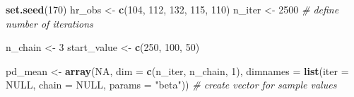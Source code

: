 \documentclass[
  12pt,
]{book}
\newenvironment{Shaded}{\begin{snugshade}}{\end{snugshade}}
\newcommand{\CommentTok}[1]{\textcolor[rgb]{0.56,0.35,0.01}{\textit{#1}}}
\newcommand{\DataTypeTok}[1]{\textcolor[rgb]{0.13,0.29,0.53}{#1}}
\newcommand{\DecValTok}[1]{\textcolor[rgb]{0.00,0.00,0.81}{#1}}
\newcommand{\KeywordTok}[1]{\textcolor[rgb]{0.13,0.29,0.53}{\textbf{#1}}}
\newcommand{\NormalTok}[1]{#1}
\newcommand{\OtherTok}[1]{\textcolor[rgb]{0.56,0.35,0.01}{#1}}
\newcommand{\StringTok}[1]{\textcolor[rgb]{0.31,0.60,0.02}{#1}}
\begin{document}
\begin{Shaded}
\begin{Highlighting}[]
\KeywordTok{set.seed}\NormalTok{(}\DecValTok{170}\NormalTok{)}
\NormalTok{hr\_obs \textless{}{-}}\StringTok{ }\KeywordTok{c}\NormalTok{(}\DecValTok{104}\NormalTok{, }\DecValTok{112}\NormalTok{, }\DecValTok{132}\NormalTok{, }\DecValTok{115}\NormalTok{, }\DecValTok{110}\NormalTok{)}
\NormalTok{n\_iter \textless{}{-}}\StringTok{ }\DecValTok{2500} \CommentTok{\# define number of iterations}

\NormalTok{n\_chain \textless{}{-}}\StringTok{ }\DecValTok{3}
\NormalTok{start\_value \textless{}{-}}\StringTok{ }\KeywordTok{c}\NormalTok{(}\DecValTok{250}\NormalTok{, }\DecValTok{100}\NormalTok{, }\DecValTok{50}\NormalTok{)}

\NormalTok{pd\_mean \textless{}{-}}\StringTok{ }\KeywordTok{array}\NormalTok{(}\OtherTok{NA}\NormalTok{, }\DataTypeTok{dim =} \KeywordTok{c}\NormalTok{(n\_iter, n\_chain, }\DecValTok{1}\NormalTok{), }\DataTypeTok{dimnames =} \KeywordTok{list}\NormalTok{(}\DataTypeTok{iter =} \OtherTok{NULL}\NormalTok{, }\DataTypeTok{chain =} \OtherTok{NULL}\NormalTok{, }\DataTypeTok{params =} \StringTok{"beta"}\NormalTok{)) }\CommentTok{\# create vector for sample values}


\end{Highlighting}
\end{Shaded}
\end{document}

